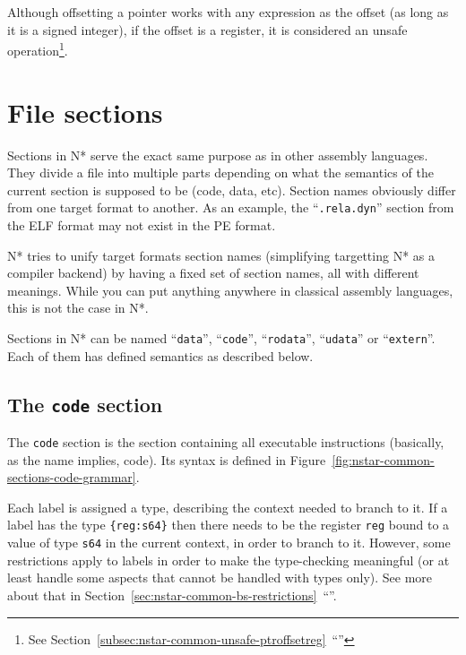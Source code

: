 Although offsetting a pointer works with any expression as the offset (as long as it is a signed integer), if the offset is a register, it is considered an unsafe operation\footnote{See Section~\ref{subsec:nstar-common-unsafe-ptroffsetreg}~``''}.

\section{File sections}\label{sec:nstar-common-sections}

Sections in N* serve the exact same purpose as in other assembly languages. They divide a file into multiple parts depending on what the semantics of the current section is supposed to be (code, data, etc).
Section names obviously differ from one target format to another. As an example, the ``\texttt{.rela.dyn}'' section from the ELF format may not exist in the PE format.

N* tries to unify target formats section names (simplifying targetting N* as a compiler backend) by having a fixed set of section names, all with different meanings. While you can put anything anywhere in classical assembly languages, this is not the case in N*.

Sections in N* can be named ``\texttt{data}'', ``\texttt{code}'', ``\texttt{rodata}'', ``\texttt{udata}'' or ``\texttt{extern}''. Each of them has defined semantics as described below.

\subsection{The \texttt{code} section}\label{subsec:nstar-common-sections-code}

The \texttt{code} section is the section containing all executable instructions (basically, as the name implies, code).
Its syntax is defined in Figure~\ref{fig:nstar-common-sections-code-grammar}.

Each label is assigned a type, describing the context needed to branch to it.
If a label has the type \texttt{\{reg:s64\}} then there needs to be the register \texttt{reg} bound to a value of type \texttt{s64} in the current context, in order to branch to it.
However, some restrictions apply to labels in order to make the type-checking meaningful (or at least handle some aspects that cannot be handled with types only). See more about that in Section~\ref{sec:nstar-common-bs-restrictions}~``''.


